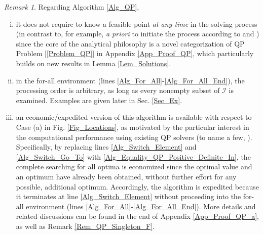 \documentclass[9pt,twocolumn,twoside,lineno]{pnas-new-1}
\newcommand{\calI}{{\mathcal I}}
\theoremstyle{remark}
\newtheorem{remark}{Remark}[section]
\begin{document}
\begin{remark} Regarding Algorithm \ref{Alg_QP},
\begin{enumerate}[i)]
\item it does not require to know a feasible point \textit{at any time} in the solving process (in contrast to, for example, \textit{a priori} to initiate the process according to \cite{BoVa:04} and \cite{Lu(Ye):03(16)}) since the core of the analytical philosophy is a novel categorization of QP Problem [\ref{Problem_QP}] in Appendix \ref{App_Proof_QP}, which particularly builds on new results in Lemma \ref{Lem_Solutions}.
\item\label{Rem_Alg_Order_For_All} in the for-all environment (lines \ref{Alg_For_All}-\ref{Alg_For_All_End}), the processing order is arbitrary, as long as every nonempty subset of $\calI$ is examined. Examples are given later in Sec. \ref{Sec_Ex}.
\item an economic/expedited version of this algorithm is available with respect to Case (a) in Fig. \ref{Fig_Locations}, as motivated by the particular interest in the computational performance using existing QP solvers (to name a few, \cite{JoFo:13,RaLe:19}). Specifically, by replacing lines \ref{Alg_Switch_Element} and \ref{Alg_Switch_Go_To} with \ref{Alg_Equality_QP_Positive_Definite_In}, the complete searching for all optima is economized since the optimal value and an optimum have already been obtained, without further effort for any possible, additional optimum. Accordingly, the algorithm is expedited because it terminates at line \ref{Alg_Switch_Element} without proceeding into the for-all environment (lines \ref{Alg_For_All}-\ref{Alg_For_All_End}). More details and related discussions can be found in the end of Appendix \ref{App_Proof_QP_a}, as well as Remark \ref{Rem_QP_Singleton_F}.
\end{enumerate}
\label{Rem_Alg}
\end{remark}
\end{document}
